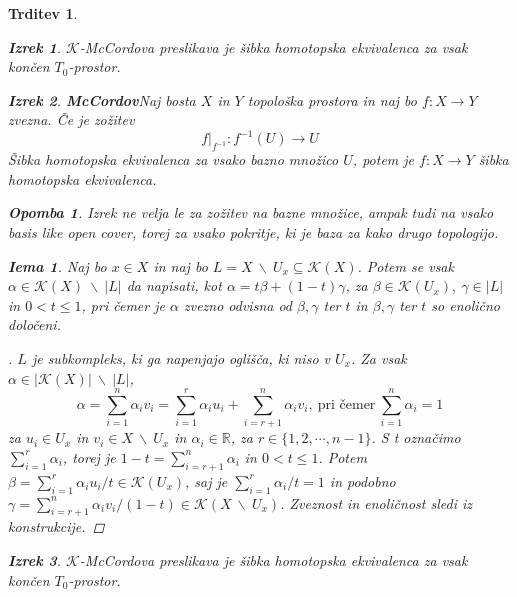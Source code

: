 \documentclass[a4paper,12pt]{article}
\DeclareRobustCommand{\k}{
    \mathcal{K}
}
\theoremstyle{definition}
\theoremstyle{plain}
\newtheorem{izrek}{Izrek}
\theoremstyle{definition}
\theoremstyle{plain}
\newtheorem{trditev}{Trditev}
\theoremstyle{plain}
\theoremstyle{plain}
\newtheorem{opomba}{Opomba}
\theoremstyle{plain}
\newtheorem{lema}{Iema}
\newenvironment{dokaz}{\begin{proof}[\bfseries\upshape\proofname]}{\end{proof}}
\begin{document}
\begin{trditev}
\begin{izrek}
    $\mathcal{K}$-\textit{McCordova} preslikava je šibka homotopska 
    ekvivalenca za vsak končen $T_0$-prostor.
\end{izrek}


\begin{izrek}{\textbf{McCordov}}\label{iz:mccord}
    Naj bosta $X$ in $Y$ topološka prostora in naj bo $f:X\rightarrow Y$ zvezna. Če je zožitev
    $$
    f|_{f^{-1}}:f^{-1}(U)\rightarrow U
    $$
    Šibka homotopska ekvivalenca za vsako bazno množico $U$, potem je $f:X\rightarrow Y$  šibka homotopska ekvivalenca.
\end{izrek}

\begin{opomba}
    Izrek ne velja le za zožitev na bazne množice, ampak tudi na vsako \textit{basis like open cover}, torej za vsako pokritje, ki je baza za kako drugo topologijo.
\end{opomba}



\begin{lema}\label{lem:sibka}
    Naj bo $x\in X$ in naj bo $L=X\ \backslash \
    U_x\subseteq \mathcal{K}(X)$. Potem se vsak $\alpha \in \k(X)\ \backslash \ |L|$ da napisati, kot $\alpha = t\beta + (1-t)\gamma$, za $\beta \in \k(U_x), \ \gamma \in |L|$ in $0<t\leq 1$, pri čemer je $\alpha$ zvezno odvisna od $\beta, \gamma$ ter $t$ in $\beta, \gamma$ ter $t$ so enolično določeni.
\end{lema}
\begin{dokaz}
    $L$ je subkompleks, ki ga napenjajo oglišča, ki niso v $U_x$. Za vsak $\alpha \in |\k(X)|\ \backslash \ |L|$, 
    $$\alpha = \sum_{i=1}^{n} \alpha_i v_i 
    = \sum_{i=1}^{r} \alpha_i u_i + \sum_{i=r+1}^{n}\alpha_i v_i,\ \text{pri čemer}\ \sum_{i=1}^{n} \alpha_i=1
    $$
    za $u_i \in U_x$ in $v_i \in X \ \backslash \ U_x$ in $\alpha_i \in \mathbb{R}$, za $r\in \{1,2, \cdots, n-1\}$. S t označimo $\sum_{i=1}^{r} \alpha_i$, torej je $1-t=\sum_{i=r+1}^{n} \alpha_i$ in $0<t\leq 1$. Potem $\beta =\sum_{i=1}^{r} \alpha_i u_i/t \in \k(U_x)$, saj je $\sum_{i=1}^{r} \alpha_i/t=1$ in podobno $\gamma=\sum_{i=r+1}^{n} 
    \alpha_i v_i/(1-t) \in \k(X \ \backslash \ U_x)$. Zveznost in enoličnost sledi iz konstrukcije.

\end{dokaz}

\begin{izrek}
    $\mathcal{K}$-\textit{McCordova} preslikava je šibka homotopska 
    ekvivalenca za vsak končen $T_0$-prostor.
\end{izrek}


\end{trditev}
\end{document}
